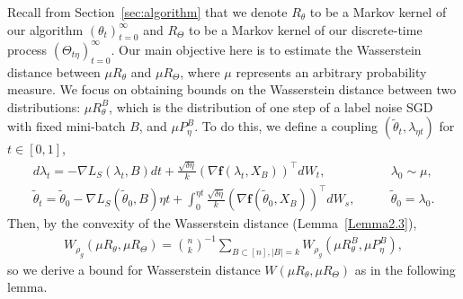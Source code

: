 \documentclass{article}
\begin{document}
Recall from Section~\ref{sec:algorithm} that we denote $R_\theta$ to be a Markov kernel of our algorithm $(\theta_t)_{t=0}^\infty$ and $R_\Theta$ to be a Markov kernel of our discrete-time process $(\Theta_{t\eta})_{t=0}^\infty$. Our main objective here is to estimate the Wasserstein distance between $\mu R_\theta$ and $\mu R_\Theta$, where $\mu$ represents an arbitrary probability measure. We focus on obtaining bounds on the Wasserstein distance between two distributions: $\mu R_\theta^B$, which is the distribution of one step of a label noise SGD with fixed mini-batch $B$, and $\mu P_\eta^B$. To do this, we define a coupling $(\tilde{\theta}_t, \lambda_{\eta t})$  for $t \in [0,1]$, 
\begin{align*}
	d\lambda_t = - \nabla L_S(\lambda_t, B)dt + \frac{\sqrt{\delta \eta}}{k} \left( \nabla \textbf{f}(\lambda_t, X_B)\right)^\top dW_t, &\quad\quad \lambda_0 \sim \mu,\\
	\tilde{\theta}_t = \tilde{\theta}_0 - \nabla L_S(\tilde{\theta}_0, B) \eta t +  \int_0^{\eta t} \frac{\sqrt{\delta \eta}}{k} \left( \nabla \textbf{f}(\tilde{\theta}_0, X_B)\right)^\top dW_{s},&\quad\quad \tilde{\theta}_0 = \lambda_0.
\end{align*}
Then, by the convexity of the Wasserstein distance (Lemma~\ref{Lemma2.3}),
\begin{align*}
	W_{\rho_g} (\mu R_\theta, \mu R_\Theta) = {n \choose k}^{-1} \sum_{B \subset [n], |B| = k} W_{\rho_g} (\mu R_\theta^B, \mu P_\eta^B),
\end{align*}
so we derive a bound for Wasserstein distance $W(\mu R_\theta, \mu R_\Theta)$ as in the following lemma.
\end{document}
